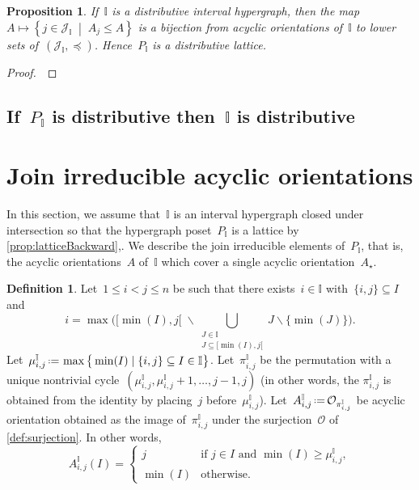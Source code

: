 \documentclass[reqno]{amsart}
\newtheorem{proposition}[theorem]{Proposition}
\theoremstyle{definition}
\newtheorem{definition}[theorem]{Definition}
\newcommand{\cal}[1]{\mathcal{#1}} %
\newcommand{\set}[2]{\left\{ #1 \;\middle|\; #2 \right\}} %
\newcommand{\bigset}[2]{\big\{ #1 \;|\; #2 \big\}} %
\newcommand{\ssm}{\smallsetminus} %
\newcommand{\eqdef}{\mbox{\,\raisebox{0.2ex}{\scriptsize\ensuremath{\mathrm:}}\ensuremath{=}\,}} %
\newcommand{\vincent}[1]{\todo[size=\tiny,color=blue!30]{ #1 \\ \hfill --- V.}\,}
\newcommand{\Or}{\mathcal O}  %
\newcommand{\II}{\mathbb I} %
\newcommand{\cJ}{\cal{J}} %
\begin{document}
\begin{proposition}
If~$\II$ is a distributive interval hypergraph, then the map~$A \mapsto \set{j \in \cJ_\II}{A_j \le A}$ is a bijection from acyclic orientations of~$\II$ to lower sets of~$(\cJ_\II, \preccurlyeq)$. Hence~$P_\II$ is a distributive lattice.
\end{proposition}

\begin{proof}
\vincent{todo}
\end{proof}


\subsection{If~$P_\II$ is distributive then~$\II$ is distributive}
\label{subsec:distributiveLatticeForward}




\section{Join irreducible acyclic orientations}
\label{sec:joinIrreducibles}

In this section, we assume that~$\II$ is an interval hypergraph closed under intersection so that the hypergraph poset~$P_\II$ is a lattice  by \cref{prop:latticeBackward},.
We describe the join irreducible elements of~$P_\II$, that is, the acyclic orientations~$A$ of~$\II$ which cover a single acyclic orientation~$A_\star$.

\begin{definition}
Let~$1 \le i < j \le n$ be such that there exists~$i \in \II$ with~$\{i,j\} \subseteq I$ and
\[
i = \max \Big( {[\min(I), j[} \; \ssm \!\!\!\!\!\!\!\! \bigcup_{\substack{J \in \II \\ J \subseteq {[\min(I), j[}}} \!\!\!\!\!\!\!\! J \ssm \{\min(J)\} \Big).
\]
Let~$\mu_{i,j}^\II \eqdef \max \bigset{\min(I)}{\{i,j\} \subseteq I \in \II}$.
Let~$\pi_{i,j}^\II$ be the permutation with a unique nontrivial cycle~$(\mu_{i,j}^\II, \mu_{i,j}^\II + 1, \dots, j-1, j)$ (in other words, the $\pi_{i,j}^\II$ is obtained from the identity by placing~$j$ before~$\mu_{i,j}^\II$).
Let~$A_{i,j}^\II \eqdef \Or_{\pi_{i,j}^\II}$ be acyclic orientation obtained as the image of~$\pi_{i,j}^\II$ under the surjection~$\Or$ of \cref{def:surjection}.
In other words,
\[
A_{i,j}^\II(I) =
\begin{cases}
	j & \text{if } j \in I \text{ and } \min(I) \ge \mu_{i,j}^\II, \\
	\min(I) & \text{otherwise.}
\end{cases}
\]
\end{definition}
\end{document}
